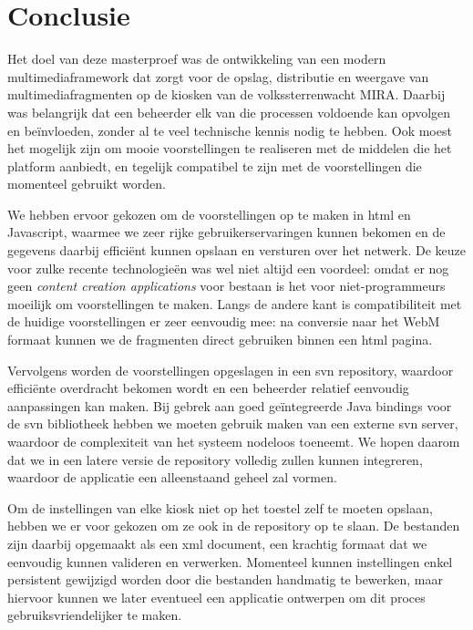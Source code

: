 %
%

\chapter{Conclusie}

Het doel van deze masterproef was de ontwikkeling van een modern multimediaframework dat zorgt voor de opslag, distributie en weergave van multimediafragmenten op de kiosken van de volkssterrenwacht MIRA. Daarbij was belangrijk dat een beheerder elk van die processen voldoende kan opvolgen en beïnvloeden, zonder al te veel technische kennis nodig te hebben. Ook moest het mogelijk zijn om mooie voorstellingen te realiseren met de middelen die het platform aanbiedt, en tegelijk compatibel te zijn met de voorstellingen die momenteel gebruikt worden.

We hebben ervoor gekozen om de voorstellingen op te maken in \ac{html} en Javascript, waarmee we zeer rijke gebruikerservaringen kunnen bekomen en de gegevens daarbij efficiënt kunnen opslaan en versturen over het netwerk. De keuze voor zulke recente technologieën was wel niet altijd een voordeel: omdat er nog geen \emph{content creation applications} voor bestaan is het voor niet-programmeurs moeilijk om voorstellingen te maken. Langs de andere kant is compatibiliteit met de huidige voorstellingen er zeer eenvoudig mee: na conversie naar het WebM formaat kunnen we de fragmenten direct gebruiken binnen een \ac{html} pagina.

Vervolgens worden de voorstellingen opgeslagen in een \ac{svn} repository, waardoor efficiënte overdracht bekomen wordt en een beheerder relatief eenvoudig aanpassingen kan maken. Bij gebrek aan goed geïntegreerde Java bindings voor de \ac{svn} bibliotheek hebben we moeten gebruik maken van een externe \ac{svn} server, waardoor de complexiteit van het systeem nodeloos toeneemt. We hopen daarom dat we in een latere versie de repository volledig zullen kunnen integreren, waardoor de applicatie een alleenstaand geheel zal vormen.

Om de instellingen van elke kiosk niet op het toestel zelf te moeten opslaan, hebben we er voor gekozen om ze ook in de repository op te slaan. De bestanden zijn daarbij opgemaakt als een \ac{xml} document, een krachtig formaat dat we eenvoudig kunnen valideren en verwerken. Momenteel kunnen instellingen enkel persistent gewijzigd worden door die bestanden handmatig te bewerken, maar hiervoor kunnen we later eventueel een applicatie ontwerpen om dit proces gebruiksvriendelijker te maken.

